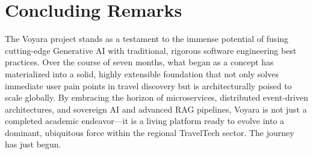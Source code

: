 \section{Concluding Remarks}
The Voyara project stands as a testament to the immense potential of fusing cutting-edge Generative AI with traditional, rigorous software engineering best practices. Over the course of seven months, what began as a concept has materialized into a solid, highly extensible foundation that not only solves immediate user pain points in travel discovery but is architecturally poised to scale globally. By embracing the horizon of microservices, distributed event-driven architectures, and sovereign AI and advanced RAG pipelines, Voyara is not just a completed academic endeavor---it is a living platform ready to evolve into a dominant, ubiquitous force within the regional TravelTech sector. The journey has just begun.
